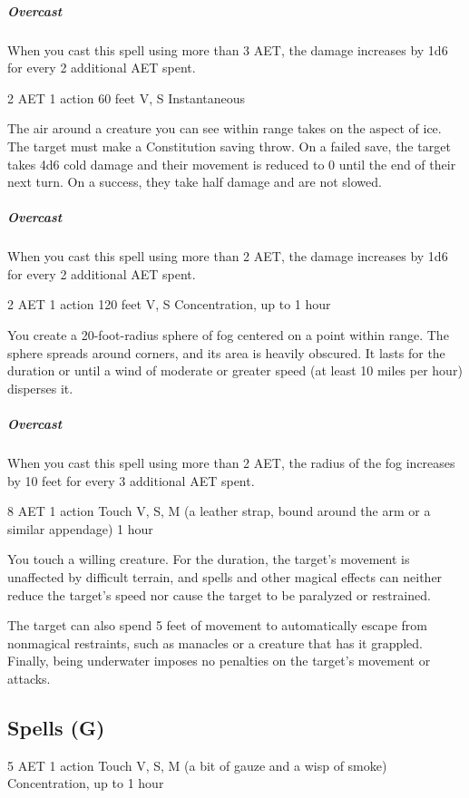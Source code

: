\subparagraph*{Overcast} When you cast this spell using more than 3 AET, the damage increases by 1d6 for every 2 additional AET spent.


{2 AET}
{1 action}
{60 feet}
{V, S}
{Instantaneous}

The air around a creature you can see within range takes on the aspect of ice. The target must make a Constitution saving throw. On a failed save, the target takes 4d6 cold damage and their movement is reduced to 0 until the end of their next turn. On a success, they take half damage and are not slowed.

\subparagraph*{Overcast} When you cast this spell using more than 2 AET, the damage increases by 1d6 for every 2 additional AET spent.


{2 AET}
{1 action}
{120 feet}
{V, S}
{Concentration, up to 1 hour}

You create a 20-foot-radius sphere of fog centered on a point within range. The sphere spreads around corners, and its area is heavily obscured. It lasts for the duration or until a wind of moderate or greater speed (at least 10 miles per hour) disperses it.

\subparagraph*{Overcast} When you cast this spell using more than 2 AET, the radius of the fog increases by 10 feet for every 3 additional AET spent.


{8 AET}
{1 action}
{Touch}
{V, S, M (a leather strap, bound around the arm or a similar appendage)}
{1 hour}

You touch a willing creature. For the duration, the target's movement is unaffected by difficult terrain, and spells and other magical effects can neither reduce the target's speed nor cause the target to be paralyzed or restrained.

The target can also spend 5 feet of movement to automatically escape from nonmagical restraints, such as manacles or a creature that has it grappled. Finally, being underwater imposes no penalties on the target's movement or attacks.

\subsection{Spells (G)}


{5 AET}
{1 action}
{Touch}
{V, S, M (a bit of gauze and a wisp of smoke)}
{Concentration, up to 1 hour}

